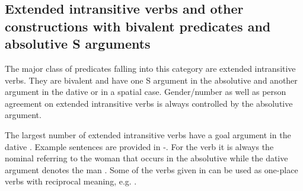 
\subsection{Extended intransitive verbs and other constructions with bivalent predicates and absolutive S arguments}
\label{sec:Extended intransitive verbs}
The major class of predicates falling into this category are extended intransitive verbs. They are bivalent and have one S argument in the absolutive and another argument in the dative or in a spatial case. Gender/number as well as person agreement on extended intransitive verbs is always controlled by the absolutive argument.

The largest number of extended intransitive verbs have a goal argument in the dative . Example sentences are provided in -. For the verb   it is always the nominal referring to the woman that occurs in the absolutive while the dative argument denotes the man . Some of the verbs given in  can be used as one-place verbs with reciprocal meaning, e.g.  .
%
